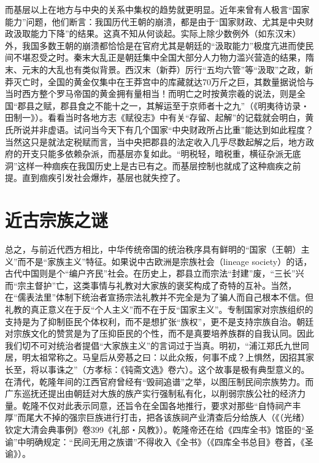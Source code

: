\documentclass[a4paper,12pt,punct=kaiming]{ctexart}
\begin{document}
而基层以上在地方与中央的关系中集权的趋势就更明显。近年来曾有人极言“国家能力”问题，他们断言：我国历代王朝的崩溃，都是由于“国家财政、尤其是中央财政汲取能力下降”的结果。这真不知从何谈起。实际上除少数例外（如东汉末）外，我国多数王朝的崩溃都恰恰是在官府尤其是朝廷的“汲取能力”极度亢进而使民间不堪忍受之时。秦末大乱正是朝廷集中全国大部分人力物力滥兴营造的结果，隋末、元末的大乱也有类似背景。西汉末（新莽）厉行“五均六管”等“汲取”之政，新莽灭亡时，全国的黄金仅集中在王莽宫中的库藏就达70万斤之巨，其数量据说恰与当时西方整个罗马帝国的黄金拥有量相当！而明亡之时按黄宗羲的说法，则是全国“郡县之赋，郡县食之不能十之一，其解运至于京师者十之九”（《明夷待访录・田制一》）。看看当时各地方志《赋役志》中有关“存留、起解”的记载就会明白，黄氏所说并非虚语。试问当今天下有几个国家“中央财政所占比重”能达到如此程度？当然这只是就法定税赋而言，当中央把郡县的法定收入几乎尽数起解之后，地方政府的开支只能多依赖杂派，而基层亦复如此。“明税轻，暗税重，横征杂派无底洞”这样一种痼疾在我国历史上是古已有之。而基层控制也就成了这种痼疾之前提。直到痼疾引发社会爆炸，基层也就失控了。

\section*{近古宗族之谜}

总之，与前近代西方相比，中华传统帝国的统治秩序具有鲜明的“国家（王朝）主义”而不是“家族主义”特征。如果说中古欧洲是宗族社会（lineage society）的话，古代中国则是个“编户齐民”社会。在历史上，郡县立而宗法“封建”废，“三长”兴而“宗主督护”亡，这类事情与礼教对大家族的褒奖构成了奇特的互补。当然，在“儒表法里”体制下统治者宣扬宗法礼教并不完全是为了骗人而自己根本不信。但礼教的真正意义在于反“个人主义”而不在于反“国家主义”。专制国家对宗族组织的支持是为了抑制臣民个体权利，而不是想扩张“族权”，更不是支持宗族自治。朝廷对宗族文化的赞赏是为了压抑臣民的个性，而不是真要培养族群的自我认同。因此我们切不可对统治者提倡“大家族主义”的言词过于当真。明初，“浦江郑氏九世同居，明太祖常称之。马皇后从旁惎之曰：以此众叛，何事不成？上惧然，因招其家长至，将以事诛之”（方孝标：《钝斋文选》卷六）。这个故事是极有典型意义的。在清代，乾隆年间的江西官府曾经有“毁祠追谱”之举，以图压制民间宗族势力。而广东巡抚还提出由朝廷对大族的族产实行强制私有化，以削弱宗族公社的经济力量。乾隆不仅对此表示同意，还旨令在全国各地推行，要求对那些“自恃祠产丰厚”而尾大不掉的强宗巨族进行打击，把各该族祠产业清查后分给族人（《（光绪）钦定大清会典事例》卷399《礼部・风教》）。乾隆帝还在给《四库全书》馆臣的“圣谕”中明确规定：“民间无用之族谱”不得收入《全书》（《四库全书总目》卷首，《圣谕》）。
\end{document}
